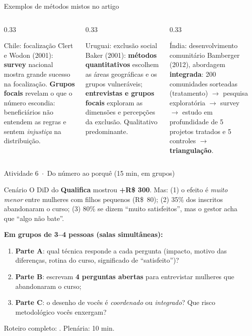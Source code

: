 \begin{frame}{Exemplos de métodos mistos no artigo}
  \begin{columns}[T]
    \begin{column}{0.33\textwidth}
      \begin{block}{Chile: focalização}
        \scriptsize
        Clert e Wodon (2001): \textbf{survey} nacional mostra grande sucesso na focalização. \textbf{Grupos focais} revelam o que o número escondia: beneficiários não entendem as regras e sentem \emph{injustiça} na distribuição.
      \end{block}
    \end{column}
    \begin{column}{0.33\textwidth}
      \begin{block}{Uruguai: exclusão social}
        \scriptsize
        Baker (2001): \textbf{métodos quantitativos} escolhem as áreas geográficas e os grupos vulneráveis; \textbf{entrevistas e grupos focais} exploram as dimensões e percepções da exclusão. Qualitativo predominante.
      \end{block}
    \end{column}
    \begin{column}{0.33\textwidth}
      \begin{block}{Índia: desenvolvimento comunitário}
        \scriptsize
        Bamberger (2012), abordagem \textbf{integrada}: 200 comunidades sorteadas (tratamento) $\to$ pesquisa exploratória $\to$ survey $\to$ estudo em profundidade de 5 projetos tratados e 5 controles $\to$ \textbf{triangulação}.
      \end{block}
    \end{column}
  \end{columns}
\end{frame}

\begin{frame}{Atividade 6 \,$\cdot$\, Do número ao porquê (15 min, em grupos)}
  \begin{atividadebox}{Cenário}
    \small
    O DiD do \textbf{Qualifica} mostrou \textbf{+R\$ 300}. Mas: (1) o efeito é \emph{muito menor} entre mulheres com filhos pequenos (R\$~80); (2) 35\% dos inscritos abandonaram o curso; (3) 80\% se dizem ``muito satisfeitos'', mas o gestor acha que ``algo não bate''.
  \end{atividadebox}
  \vspace{0.1cm}
  \small
  \textbf{Em grupos de 3--4 pessoas (salas simultâneas):}
  \begin{enumerate}
    \item \textbf{Parte A}: qual técnica responde a cada pergunta (impacto, motivo das diferenças, rotina do curso, significado de ``satisfeito'')?
    \item \textbf{Parte B}: escrevam \textbf{4 perguntas abertas} para entrevistar mulheres que abandonaram o curso;
    \item \textbf{Parte C}: o desenho de vocês é \emph{coordenado} ou \emph{integrado}? Que risco metodológico vocês enxergam?
  \end{enumerate}
  \vfill{\scriptsize Roteiro completo: . Plenária: 10 min.}
\end{frame}
